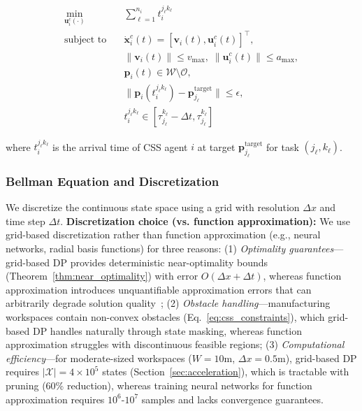 \documentclass[manuscript,screen,review]{acmart}
\begin{document}
\begin{equation}
\begin{aligned}
\min_{\mathbf{u}_i^c(\cdot)} \quad & \sum_{\ell=1}^{n_i} t_i^{j_\ell k_\ell} \\
\text{subject to} \quad & \dot{\mathbf{x}}_i^c(t) = [\mathbf{v}_i(t), \mathbf{u}_i^c(t)]^\top, \\
& \|\mathbf{v}_i(t)\| \leq v_{\max}, \; \|\mathbf{u}_i^c(t)\| \leq a_{\max}, \\
& \mathbf{p}_i(t) \in \mathcal{W} \setminus \mathcal{O}, \\
& \|\mathbf{p}_i(t_i^{j_\ell k_\ell}) - \mathbf{p}_{j_\ell}^{\text{target}}\| \leq \epsilon, \\
& t_i^{j_\ell k_\ell} \in [\tau_{j_\ell}^{k_\ell} - \Delta t, \tau_{j_\ell}^{k_\ell}]
\end{aligned}
\label{eq:css_dp_problem}
\end{equation}

where $t_i^{j_\ell k_\ell}$ is the arrival time of CSS agent $i$ at target 
$\mathbf{p}_{j_\ell}^{\text{target}}$ for task $(j_\ell, k_\ell)$.

\subsubsection{Bellman Equation and Discretization}

We discretize the continuous state space using a grid with resolution
$\Delta x$ and time step $\Delta t$. \textbf{Discretization choice 
(vs. function approximation):} We use grid-based discretization rather than 
function approximation (e.g., neural networks, radial basis functions) for 
three reasons: (1) \textit{Optimality guarantees}—grid-based DP provides 
deterministic near-optimality bounds (Theorem~\ref{thm:near_optimality}) 
with error $O(\Delta x + \Delta t)$, whereas function approximation introduces 
unquantifiable approximation errors that can arbitrarily degrade solution 
quality~\cite{li2019quality}; (2) \textit{Obstacle handling}—manufacturing 
workspaces contain non-convex obstacles (Eq.~\ref{eq:css_constraints}), which 
grid-based DP handles naturally through state masking, whereas function 
approximation struggles with discontinuous feasible regions; (3) 
\textit{Computational efficiency}—for moderate-sized workspaces ($W = 10$m, 
$\Delta x = 0.5$m), grid-based DP requires $|\mathcal{X}| = 4 \times 10^5$ 
states (Section~\ref{sec:acceleration}), which is tractable with pruning 
(60\% reduction), whereas training neural networks for function approximation 
requires $10^6$-$10^7$ samples and lacks convergence guarantees.
\end{document}

